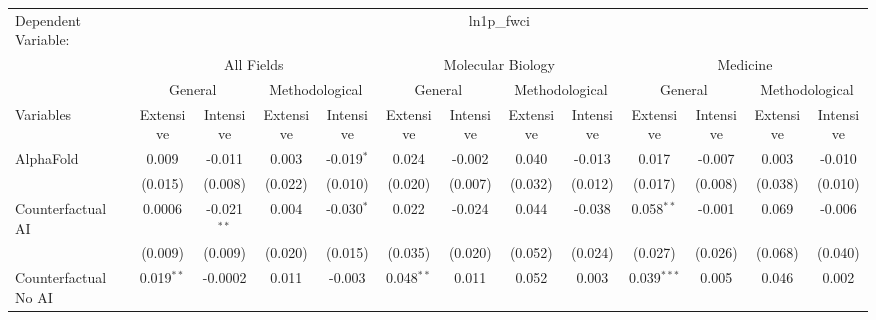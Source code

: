 \begingroup
\centering
\begin{tabular}{lcccccccccccc}
   \tabularnewline \midrule \midrule
   Dependent Variable: & \multicolumn{12}{c}{ln1p\_fwci}\\
 & \multicolumn{4}{c}{All Fields} & \multicolumn{4}{c}{Molecular Biology} & \multicolumn{4}{c}{Medicine} \\
\cmidrule(lr){2-5} \cmidrule(lr){6-9} \cmidrule(lr){10-13}
 & \multicolumn{2}{c}{General} & \multicolumn{2}{c}{Methodological} & \multicolumn{2}{c}{General} & \multicolumn{2}{c}{Methodological} & \multicolumn{2}{c}{General} & \multicolumn{2}{c}{Methodological} \\
\cmidrule(lr){2-3} \cmidrule(lr){4-5} \cmidrule(lr){6-7} \cmidrule(lr){8-9} \cmidrule(lr){10-11} \cmidrule(lr){12-13}
Variables & \multicolumn{1}{c}{Extensive} & \multicolumn{1}{c}{Intensive} & \multicolumn{1}{c}{Extensive} & \multicolumn{1}{c}{Intensive} & \multicolumn{1}{c}{Extensive} & \multicolumn{1}{c}{Intensive} & \multicolumn{1}{c}{Extensive} & \multicolumn{1}{c}{Intensive} & \multicolumn{1}{c}{Extensive} & \multicolumn{1}{c}{Intensive} & \multicolumn{1}{c}{Extensive} & \multicolumn{1}{c}{Intensive} \\
\cmidrule(lr){1-1}\cmidrule(lr){2-2} \cmidrule(lr){3-3} \cmidrule(lr){4-4} \cmidrule(lr){5-5} \cmidrule(lr){6-6} \cmidrule(lr){7-7} \cmidrule(lr){8-8} \cmidrule(lr){9-9} \cmidrule(lr){10-10} \cmidrule(lr){11-11} \cmidrule(lr){12-12} \cmidrule(lr){13-13}
   AlphaFold                                & 0.009        & -0.011        & 0.003   & -0.019$^{*}$ & 0.024        & -0.002  & 0.040         & -0.013  & 0.017         & -0.007  & 0.003   & -0.010\\   
                                            & (0.015)      & (0.008)       & (0.022) & (0.010)      & (0.020)      & (0.007) & (0.032)       & (0.012) & (0.017)       & (0.008) & (0.038) & (0.010)\\   
   Counterfactual AI                        & 0.0006       & -0.021$^{**}$ & 0.004   & -0.030$^{*}$ & 0.022        & -0.024  & 0.044         & -0.038  & 0.058$^{**}$  & -0.001  & 0.069   & -0.006\\   
                                            & (0.009)      & (0.009)       & (0.020) & (0.015)      & (0.035)      & (0.020) & (0.052)       & (0.024) & (0.027)       & (0.026) & (0.068) & (0.040)\\   
   Counterfactual No AI                     & 0.019$^{**}$ & -0.0002       & 0.011   & -0.003       & 0.048$^{**}$ & 0.011   & 0.052         & 0.003   & 0.039$^{***}$ & 0.005   & 0.046   & 0.002\\   

\end{tabular}

